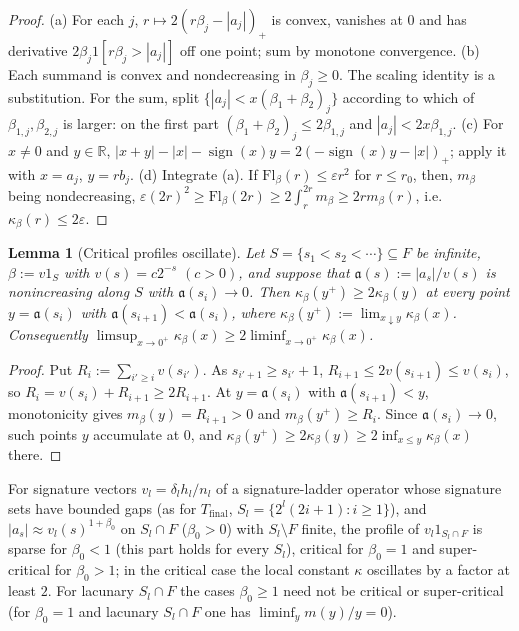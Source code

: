 \documentclass[10pt]{amsart}
\newtheorem{lemma}[theorem]{Lemma}
\theoremstyle{definition}
\theoremstyle{remark}
\newcommand{\sgn}{\operatorname{sign}}
\newcommand{\R}{\mathbb R}
\begin{document}
\begin{proof}
(a) For each $j$, $r\mapsto2(r\beta_j-|a_j|)_+$ is convex, vanishes at $0$
and has derivative $2\beta_j1[r\beta_j>|a_j|]$ off one point; sum by
monotone convergence.  (b) Each summand is convex and nondecreasing in
$\beta_j\ge0$.  The scaling identity is a substitution.  For the sum, split
$\{|a_j|<x(\beta_1+\beta_2)_j\}$ according to which of $\beta_{1,j},
\beta_{2,j}$ is larger: on the first part $(\beta_1+\beta_2)_j\le
2\beta_{1,j}$ and $|a_j|<2x\beta_{1,j}$.  (c) For $x\ne0$ and $y\in\R$,
$|x+y|-|x|-\sgn(x)y=2(-\sgn(x)y-|x|)_+$; apply it with $x=a_j$, $y=rb_j$.
(d) Integrate (a).  If $\mathrm{Fl}_\beta(r)\le\varepsilon r^2$ for $r\le r_0$,
then, $m_\beta$ being nondecreasing, $\varepsilon(2r)^2\ge\mathrm{Fl}_\beta(2r)\ge
2\int_r^{2r}m_\beta\ge2rm_\beta(r)$, i.e.\ $\kappa_\beta(r)\le2\varepsilon$.
\end{proof}

\begin{lemma}[Critical profiles oscillate]\label{lem:II-oscillate}
Let $S=\{s_1<s_2<\cdots\}\subseteq F$ be infinite, $\beta:=v1_S$ with
$v(s)=c2^{-s}$ $(c>0)$, and suppose that $\mathfrak a(s):=|a_s|/v(s)$ is
nonincreasing along $S$ with $\mathfrak a(s_i)\to0$.  Then
$\kappa_\beta(y^+)\ge2\kappa_\beta(y)$ at every point $y=\mathfrak a(s_i)$ with
$\mathfrak a(s_{i+1})<\mathfrak a(s_i)$, where $\kappa_\beta(y^+):=\lim_{x\downarrow
y}\kappa_\beta(x)$.  Consequently $\limsup_{x\to0^+}\kappa_\beta(x)\ge2
\liminf_{x\to0^+}\kappa_\beta(x)$.
\end{lemma}

\begin{proof}
Put $R_i:=\sum_{i'\ge i}v(s_{i'})$.  As $s_{i'+1}\ge s_{i'}+1$,
$R_{i+1}\le2v(s_{i+1})\le v(s_i)$, so $R_i=v(s_i)+R_{i+1}\ge2R_{i+1}$.  At
$y=\mathfrak a(s_i)$ with $\mathfrak a(s_{i+1})<y$, monotonicity gives $m_\beta(y)=
R_{i+1}>0$ and $m_\beta(y^+)\ge R_i$.  Since $\mathfrak a(s_i)\to0$, such points
$y$ accumulate at $0$, and $\kappa_\beta(y^+)\ge2\kappa_\beta(y)\ge2\inf_{x\le
y}\kappa_\beta(x)$ there.
\end{proof}

For signature vectors $v_l=\delta_lh_l/n_l$ of a signature-ladder operator
whose signature sets have bounded gaps (as for $T_{\mathrm{final}}$, $S_l=
\{2^l(2i+1):i\ge1\}$), and $|a_s|\approx v_l(s)^{1+\beta_0}$ on $S_l\cap F$
($\beta_0>0$) with $S_l\setminus F$ finite, the profile of $v_l1_{S_l\cap F}$
is sparse for $\beta_0<1$ (this part holds for every $S_l$), critical for
$\beta_0=1$ and super-critical for $\beta_0>1$; in the critical case the
local constant $\kappa$ oscillates by a factor at least $2$.  For lacunary
$S_l\cap F$ the cases $\beta_0\ge1$ need not be critical or super-critical
(for $\beta_0=1$ and lacunary $S_l\cap F$ one has $\liminf_ym(y)/y=0$).
\end{document}
